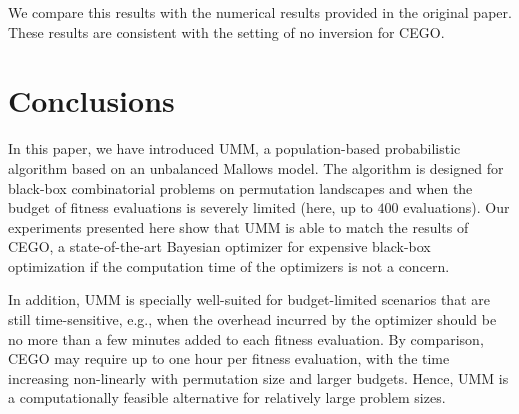 \documentclass[sigconf,dvipsnames]{acmart}
\begin{document}
We compare this results with the numerical results provided in the original paper. These results are consistent with the setting of no inversion for CEGO. 

\section{Conclusions}\label{sec:conclusions}

In this paper, we have introduced UMM, a population-based probabilistic
algorithm based on an unbalanced Mallows model. The algorithm is designed for
black-box combinatorial problems on permutation landscapes and when the budget
of fitness evaluations is severely limited (here, up to $400$ evaluations).
Our experiments presented here show that UMM is able to match the results of
CEGO, a state-of-the-art Bayesian optimizer for expensive black-box
optimization if the computation time of the optimizers is not a concern.

In addition, UMM is specially well-suited for budget-limited scenarios that are
still time-sensitive, e.g., when the overhead incurred by the optimizer should
be no more than a few minutes added to each fitness evaluation. By comparison,
CEGO may require up to one hour per fitness evaluation, with the time
increasing non-linearly with permutation size and larger budgets.  Hence, UMM
is a computationally feasible alternative for relatively large problem sizes.


\end{document}
